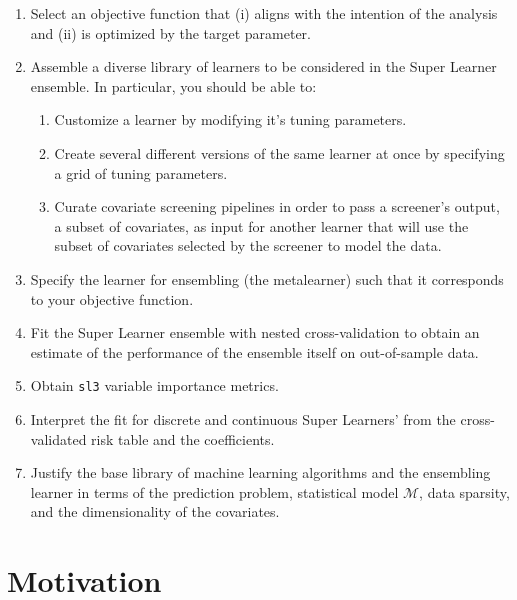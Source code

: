 \documentclass[
  12pt, krantz2,
]{krantz}
\newcommand{\passthrough}[1]{#1}
\providecommand{\tightlist}{%
  \setlength{\itemsep}{0pt}\setlength{\parskip}{0pt}}
\theoremstyle{definition}
\theoremstyle{definition}
\theoremstyle{definition}
\newcommand{\M}{\mathcal{M}}
\newcommand{\1}{\mathbbm{1}}
\begin{document}
\begin{enumerate}
\def\labelenumi{\arabic{enumi}.}
\item
  Select an objective function that (i) aligns with the intention of the
  analysis and (ii) is optimized by the target parameter.
\item
  Assemble a diverse library of learners to be considered in the Super Learner
  ensemble. In particular, you should be able to:

  \begin{enumerate}
  \def\labelenumii{\alph{enumii}.}
  \tightlist
  \item
    Customize a learner by modifying it's tuning parameters.
  \item
    Create several different versions of the same learner at once by
    specifying a grid of tuning parameters.
  \item
    Curate covariate screening pipelines in order to pass a screener's
    output, a subset of covariates, as input for another learner that will
    use the subset of covariates selected by the screener to model the data.
  \end{enumerate}
\item
  Specify the learner for ensembling (the metalearner) such that it corresponds
  to your objective function.
\item
  Fit the Super Learner ensemble with nested cross-validation to obtain an
  estimate of the performance of the ensemble itself on out-of-sample data.
\item
  Obtain \passthrough{\lstinline!sl3!} variable importance metrics.
\item
  Interpret the fit for discrete and continuous Super Learners' from the
  cross-validated risk table and the coefficients.
\item
  Justify the base library of machine learning algorithms and the ensembling
  learner in terms of the prediction problem, statistical model \(\M\), data
  sparsity, and the dimensionality of the covariates.
\end{enumerate}

\hypertarget{motivation}{%
\section*{Motivation}\label{motivation}}
\end{document}
